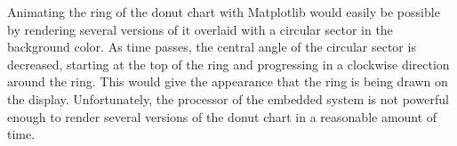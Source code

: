 Animating the ring of the donut chart with Matplotlib would easily be possible by rendering several versions of it overlaid with a circular sector in the background color.
As time passes, the central angle of the circular sector is decreased, starting at the top of the ring and progressing in a clockwise direction around the ring.
This would give the appearance that the ring is being drawn on the display.
Unfortunately, the processor of the embedded system is not powerful enough to render several versions of the donut chart in a reasonable amount of time.

